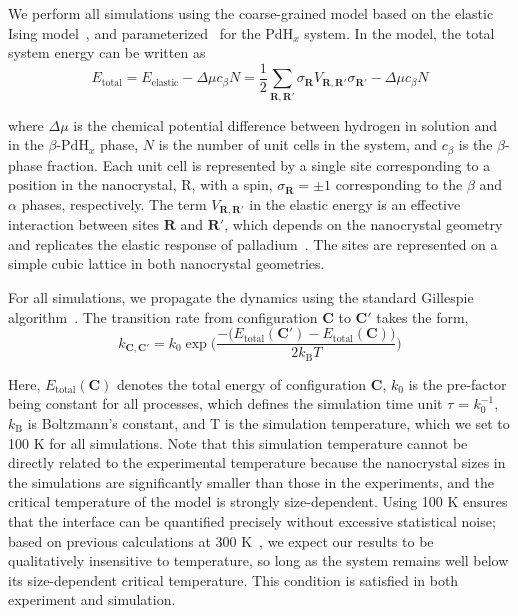 \documentclass[reprint,amsmath,amssymb,aip,nofootinbib, citeautoscript,]{revtex4-2}
\begin{document}
We perform all simulations using the coarse-grained model based on the elastic Ising model~\cite{fratzl_modeling_1999,frechette_consequences_2019,frechette_elastic_2021}, and parameterized~\cite{lee_atomic_2024} for the $\mathrm{PdH}_x$ system. In the model, the total system energy can be written as
$$E_\mathrm{total}= E_\mathrm{elastic}-\Delta\mu c_\beta N = \frac{1}{2}\sum_{\mathbf{R},\mathbf{R'}}\sigma_\mathbf{R}V_{\mathbf{R},\mathbf{R'}}\sigma_{\mathbf{R'}} -\Delta\mu c_\beta N$$

where $\Delta$$\mu$ is the chemical potential difference between hydrogen in solution and in the $\beta$-$\mathrm{PdH}_x$ phase, $N$ is the number of unit cells in the system, and $c_\beta$ is the $\beta$-phase fraction. Each unit cell is represented by a single site corresponding to a position in the nanocrystal, R, with a spin, $\sigma_\mathbf{R} = \pm 1$ corresponding to the $\beta$ and $\alpha$ phases, respectively. The term $V_{\mathbf{R},\mathbf{R'}}$ in the elastic energy is an effective interaction between sites $\mathbf{R}$ and $\mathbf{R'}$, which depends on the nanocrystal geometry and replicates the elastic response of palladium~\cite{lee_atomic_2024}. The sites are represented on a simple cubic lattice in both nanocrystal geometries.


For all simulations, we propagate the dynamics using the standard Gillespie algorithm~\cite{gillespie_stochastic_2007}. The transition rate from configuration $\mathbf{C}$ to $\mathbf{C'}$ takes the form,
$$k_{\mathbf{C},\mathbf{C'}}=k_0\exp\bigg(\frac{-\big(E_\mathrm{total}(\mathbf{C'}) - E_\mathrm{total}(\mathbf{C})\big)}{2k_\mathrm{B}T}\bigg)$$

Here, $E_{\mathrm{total}}(\mathbf{C})$ denotes the total energy of configuration $\mathbf{C}$, $k_0$ is the pre-factor being constant for all processes, which defines the simulation time unit $\tau$ = $k_0^{-1}$, $k_{\mathrm{B}}$ is Boltzmann’s constant, and T is the simulation temperature, which we set to 100 K for all simulations. Note that this simulation temperature cannot be directly related to the experimental temperature because the nanocrystal sizes in the simulations are significantly smaller than those in the experiments, and the critical temperature of the model is strongly size-dependent. Using 100 K ensures that the interface can be quantified precisely without excessive statistical noise; based on previous calculations at 300 K~\cite{lee_atomic_2024}, we expect our results to be qualitatively insensitive to temperature, so long as the system remains well below its size-dependent critical temperature. This condition is satisfied in both experiment and simulation.
\end{document}
